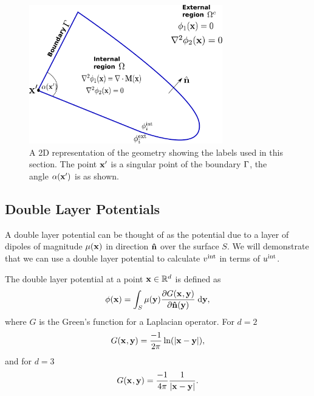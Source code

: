 \begin{figure}
  \center
  \includegraphics[width=0.75\textwidth]{./images/BEM-geometry}




  \caption{A 2D representation of the geometry showing the labels used in this section. The point $\mathbf{x}'$ is a singular point of the boundary ${\Gamma}$, the angle $\alpha(\mathbf{x}')$ is as shown.}
  \label{fig:BEM-geometry}
\end{figure}

\subsection{Double Layer Potentials}
\label{sec:double-layer-potent}
A double layer potential can be thought of as the potential due to a layer of dipoles of magnitude $\mu(\mathbf{x})$ in direction $\mathbf{\hat{n}}$ over the surface $S$.\cite{Sternberg1946} We will demonstrate that we can use a double layer potential to calculate $v^{\text{int}}$ in terms of $u^{\text{int}}$.

The double layer potential at a point $\mathbf{x} \in \mathbb{R}^d$ is defined as \cite{eom_double_layer_potential}
\begin{equation}
  \label{eq:3}
  \phi(\mathbf{x}) = \int_{S} \mu(\mathbf{y}) \frac{\partial G(\mathbf{x}_{},\mathbf{y})}{\partial \mathbf{\hat{n}}(\mathbf{y})} {\; \text{d}} \mathbf{y},
\end{equation}
where $G$ is the Green's function for a Laplacian operator.
For $d=2$
\[ G(\mathbf{x}_{},\mathbf{y}) = \dfrac{-1}{2\pi}\ln(\left|{\mathbf{x} - \mathbf{y}} \right|), \]
and for $d=3$
\begin{equation} G(\mathbf{x}_{},\mathbf{y}) = \dfrac{-1}{4 \pi} \dfrac{1}{\left|{\mathbf{x} - \mathbf{y}} \right|}.
  \label{eqn:greenslaplacian3d}
\end{equation}


